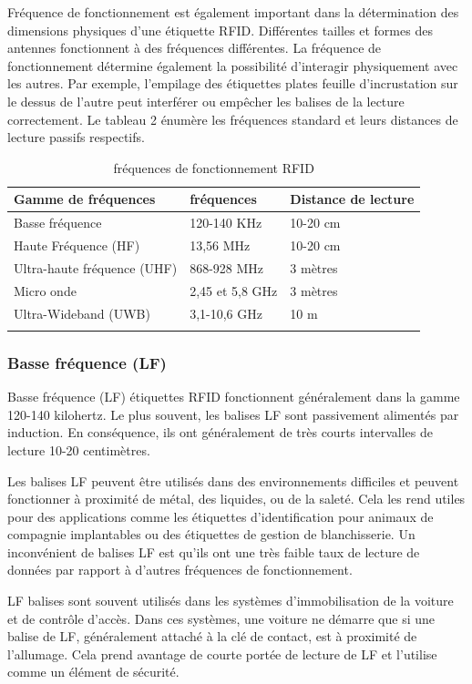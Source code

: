 \documentclass[11pt, a4paper, twoside]{book}
\begin{document}
Fréquence de fonctionnement est également important dans la détermination des dimensions physiques d'une étiquette RFID. Différentes tailles et formes des antennes fonctionnent à des fréquences différentes. La fréquence de fonctionnement détermine également la possibilité d'interagir physiquement avec les autres. Par exemple, l'empilage des étiquettes plates feuille d'incrustation sur le dessus de l'autre peut interférer ou empêcher les balises de la lecture correctement. Le tableau 2 énumère les fréquences standard et leurs distances de lecture passifs respectifs.\\
\begin{longtable}{|p{}|p{}|p{}|}
\hline
\textbf{Gamme de fréquences} & \textbf{fréquences} & \textbf{Distance de lecture} \\
\hline
Basse fréquence & 120-140 KHz & 10-20 cm  \\
\hline
Haute Fréquence (HF) & 13,56 MHz & 10-20 cm \\
\hline
Ultra-haute fréquence (UHF) & 868-928 MHz & 3 mètres \\
\hline
Micro onde & 2,45 et 5,8 GHz & 3 mètres \\
\hline
Ultra-Wideband (UWB) & 3,1-10,6 GHz & 10 m \\
\hline
\caption{fréquences de fonctionnement RFID}
\end{longtable}
\subsubsection{Basse fréquence (LF)}
Basse fréquence (LF) étiquettes RFID fonctionnent généralement dans la gamme 120-140 kilohertz. Le plus souvent, les balises LF sont passivement alimentés par induction. En conséquence, ils ont généralement de très courts intervalles de lecture 10-20 centimètres.

Les balises LF peuvent être utilisés dans des environnements difficiles et peuvent fonctionner à proximité de métal, des liquides, ou de la saleté. Cela les rend utiles pour des applications comme les étiquettes d'identification pour animaux de compagnie implantables ou des étiquettes de gestion de blanchisserie. Un inconvénient de balises LF est qu'ils ont une très faible taux de lecture de données par rapport à d'autres fréquences de fonctionnement.

LF balises sont souvent utilisés dans les systèmes d'immobilisation de la voiture et de contrôle d'accès. Dans ces systèmes, une voiture ne démarre que si une balise de LF, généralement attaché à la clé de contact, est à proximité de l'allumage. Cela prend avantage de courte portée de lecture de LF et l'utilise comme un élément de sécurité.
\end{document}

